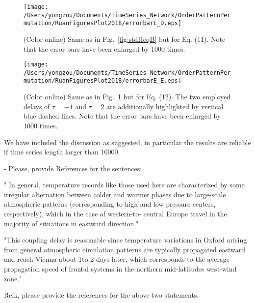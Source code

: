 \documentclass[aps,chaos,superscriptaddress,showkeys]{revtex4}
\begin{document}
\begin{figure}
	\centering
	\texttt{[image: /Users/yongzou/Documents/TimeSeries\_Network/OrderPatternPermutation/RuanFiguresPlot2018/errorbarE\_D.eps]}
\caption{(Color online) Same as in Fig.~\ref{fig:stdHeqB} but for Eq. (11).  {\color{red}Note that the error bars have been enlarged by 1000 times.} \label{fig:stdHeqD}}
\end{figure}

\begin{figure}
	\centering
	\texttt{[image: /Users/yongzou/Documents/TimeSeries\_Network/OrderPatternPermutation/RuanFiguresPlot2018/errorbarE\_E.eps]}
\caption{(Color online) Same as in Fig.~\ref{fig:stdHeqD} but for Eq. (12). The two employed delays of $\tau = -1$ and $\tau = 2$ are additionally highlighted by vertical blue dashed lines. {\color{red}Note that the error bars have been enlarged by 1000 times.}\label{fig:stdHeqE}}
\end{figure}




\begin{center}
\begin{minipage}[c]{0.9\textwidth}
We have included the discussion as suggested, in particular the results are reliable if time series length larger than 10000. 
\end{minipage}
\end{center}



\noindent
{- Please, provide References for the sentences: 

" In general, temperature records like those used here are characterized by some irregular alternation between colder and warmer phases due to large-scale atmospheric patterns (corresponding to high and low pressure centers, respectively), which in the case of western-to- central Europe travel in the majority of situations in eastward direction." 


"This coupling delay is reasonable since temperature variations in Oxford arising from general atmospheric circulation patterns are typically propagated eastward and reach Vienna about 1to 2 days later, which corresponds to the average propagation speed of frontal systems in the northern mid-latitudes west-wind zone."}

\begin{center}
\begin{minipage}[c]{0.9\textwidth}
Reik, please provide the references for the above two statements. 
\end{minipage}
\end{center}
\end{document}
